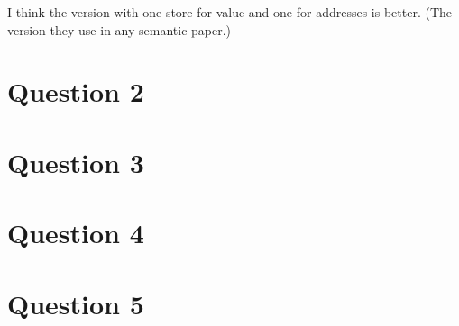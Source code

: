 \documentclass{article}
\begin{document}
I think the version with one store for value and one for addresses is better. (The version they use in any semantic paper.)

\section*{Question 2}

\section*{Question 3}

\section*{Question 4}

\section*{Question 5}
\end{document}
